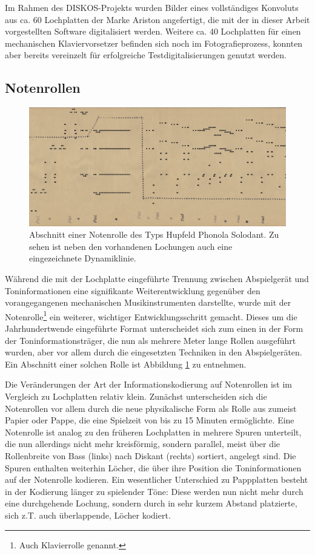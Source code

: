 Im Rahmen des DISKOS-Projekts wurden Bilder eines vollständiges Konvoluts aus ca. 60 Lochplatten der Marke Ariston angefertigt, die mit der in dieser Arbeit vorgestellten Software digitalisiert werden.
Weitere ca. 40 Lochplatten für einen mechanischen Klaviervorsetzer befinden sich noch im Fotografieprozess, konnten aber bereits vereinzelt für erfolgreiche Testdigitalisierungen genutzt werden.

\subsection{Notenrollen}

\begin{figure}[t]
    \centering
    \includegraphics[width=\textwidth]{graphics/pianoroll.png}
    \caption{Abschnitt einer Notenrolle des Typs Hupfeld Phonola Solodant. Zu sehen ist neben den vorhandenen Lochungen auch eine eingezeichnete Dynamiklinie.}
    \label{pianoroll}
\end{figure}

Während die mit der Lochplatte eingeführte Trennung zwischen Abspielgerät und Toninformationen eine signifikante Weiterentwicklung gegenüber den vorangegangenen mechanischen Musikinstrumenten darstellte, wurde mit der Notenrolle\footnote{Auch Klavierrolle genannt.} ein weiterer, wichtiger Entwicklungsschritt gemacht.
Dieses um die Jahrhundertwende eingeführte Format unterscheidet sich zum einen in der Form der Toninformationsträger, die nun als mehrere Meter lange Rollen ausgeführt wurden, aber vor allem durch die eingesetzten Techniken in den Abspielgeräten.
Ein Abschnitt einer solchen Rolle ist Abbildung \ref{pianoroll} zu entnehmen.

Die Veränderungen der Art der Informationskodierung auf Notenrollen ist im Vergleich zu Lochplatten relativ klein.
Zunächst unterscheiden sich die Notenrollen vor allem durch die neue physikalische Form als Rolle aus zumeist Papier oder Pappe, die eine Spielzeit von bis zu 15 Minuten ermöglichte.
Eine Notenrolle ist analog zu den früheren Lochplatten in mehrere Spuren unterteilt, die nun allerdings nicht mehr kreisförmig, sondern parallel, meist über die Rollenbreite von Bass (links) nach Diskant (rechts) sortiert, angelegt sind.
Die Spuren enthalten weiterhin Löcher, die über ihre Position die Toninformationen auf der Notenrolle kodieren.
Ein wesentlicher Unterschied zu Pappplatten besteht in der Kodierung länger zu spielender Töne: Diese werden nun nicht mehr durch eine durchgehende Lochung, sondern durch in sehr kurzem Abstand platzierte, sich z.T. auch überlappende, Löcher kodiert.

